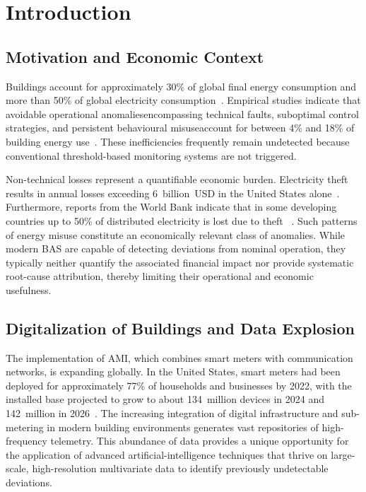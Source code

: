 \chapter{Introduction}
\label{chap:introduction}

\section{Motivation and Economic Context}

Buildings account for approximately 30\% of global final energy consumption and more than 50\% of global electricity consumption~\cite{alvsauskas2024world}. Empirical studies indicate that avoidable operational anomalies\textemdash encompassing technical faults, suboptimal control strategies, and persistent behavioural misuse\textemdash account for between 4\% and 18\% of building energy use~\cite{roth2004energy}. These inefficiencies frequently remain undetected because conventional threshold-based monitoring systems are not triggered.

Non-technical losses represent a quantifiable economic burden. Electricity theft results in annual losses exceeding 6~billion~USD in the United States alone~\cite{mcdaniel2009security}. Furthermore, reports from the World Bank indicate that in some developing countries up to 50\% of distributed electricity is lost due to theft ~\cite{antmann2009reducing}. Such patterns of energy misuse constitute an economically relevant class of anomalies. While modern \ac{BAS} are capable of detecting deviations from nominal operation, they typically neither quantify the associated financial impact nor provide systematic root-cause attribution, thereby limiting their operational and economic usefulness.

\section{Digitalization of Buildings and Data Explosion}

The implementation of \ac{AMI}, which combines smart meters with communication networks, is expanding globally. In the United States, smart meters had been deployed for approximately 77\% of households and businesses by 2022, with the installed base projected to grow to about 134~million devices in 2024 and 142~million in 2026~\cite{enlit2024smartmeters}. The increasing integration of digital infrastructure and sub-metering in modern building environments generates vast repositories of high-frequency telemetry. This abundance of data provides a unique opportunity for the application of advanced artificial-intelligence techniques that thrive on large-scale, high-resolution multivariate data to identify previously undetectable deviations.


